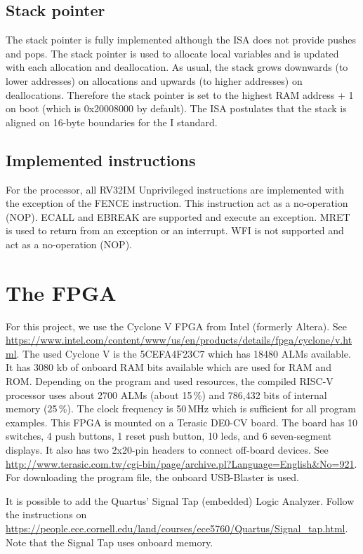 \documentclass[12pt]{article}
\begin{document}
\subsection{Stack pointer}
The stack pointer is fully implemented although the ISA does not provide pushes and pops. The stack pointer is used to allocate local variables and is updated with each allocation and deallocation. As usual, the stack grows downwards (to lower addresses) on allocations and upwards (to higher addresses) on deallocations. Therefore the stack pointer is set to the highest RAM address + 1 on boot (which is 0x20008000 by default). The ISA postulates that the stack is aligned on 16-byte boundaries for the I standard.

\subsection{Implemented instructions}
For the processor, all RV32IM Unprivileged instructions are implemented with the exception of the FENCE instruction. This instruction act as a no-operation (NOP). ECALL and EBREAK are supported and execute an exception. MRET is used to return from an exception or an interrupt. WFI is not supported and act as a no-operation (NOP).

\section{The FPGA}
For this project, we use the Cyclone V FPGA from Intel (formerly Altera). See \url{https://www.intel.com/content/www/us/en/products/details/fpga/cyclone/v.html}.
The used Cyclone V is the 5CEFA4F23C7 which has 18480 ALMs available. It has 3080 kb of onboard RAM bits available which are used for RAM and ROM. Depending on the program and used resources, the compiled RISC-V processor uses about 2700 ALMs (about 15\,\%) and 786,432 bits of internal memory (25\,\%). The clock frequency is 50\,MHz which is sufficient for all program examples. This FPGA is mounted on a Terasic DE0-CV board. The board has 10 switches, 4 push buttons, 1 reset push button, 10 leds, and 6 seven-segment displays. It also has two 2x20-pin headers to connect off-board devices. See \url{http://www.terasic.com.tw/cgi-bin/page/archive.pl?Language=English&No=921}. For downloading the program file, the onboard USB-Blaster is used.

It is possible to add the Quartus' Signal Tap (embedded) Logic Analyzer. Follow the instructions on \url{https://people.ece.cornell.edu/land/courses/ece5760/Quartus/Signal_tap.html}. Note that the Signal Tap uses onboard memory.
\end{document}
